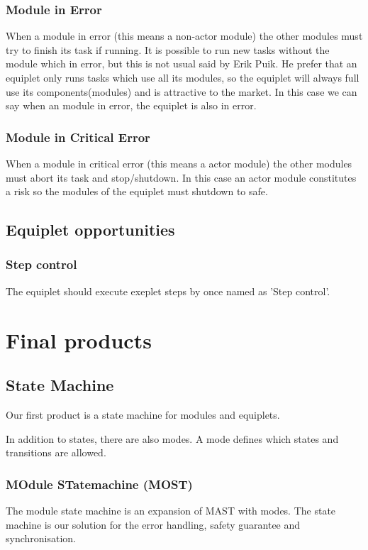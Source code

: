 \documentclass[12pt,a4paper]{report}
\begin{document}
\subsubsection{Module in Error}
When a module in error (this means a non-actor module) the other modules must try to finish its task if running. It is possible to run new tasks without the module which in error, but this is not usual said by Erik Puik. He prefer that an equiplet only runs tasks which use all its modules, so the equiplet will always full use its components(modules) and is attractive to the market. In this case we can say when an module in error, the equiplet is also in error.
\subsubsection{Module in Critical Error}
When a module in critical error (this means a actor module) the other modules must abort its task and stop/shutdown. In this case an actor module constitutes a risk so the modules of the equiplet must shutdown to safe.

\subsection{Equiplet opportunities}
\subsubsection{Step control}
The equiplet should execute exeplet steps by once named as 'Step control'.

\section{Final products}
\subsection{State Machine}
Our first product is a state machine for modules and equiplets. 

In addition to states, there are also modes.
A mode defines which states and transitions are allowed.

\subsubsection{MOdule STatemachine (MOST)}
The module state machine is an expansion of MAST with modes.
The state machine is our solution for the error handling, safety guarantee and synchronisation.
\end{document}
